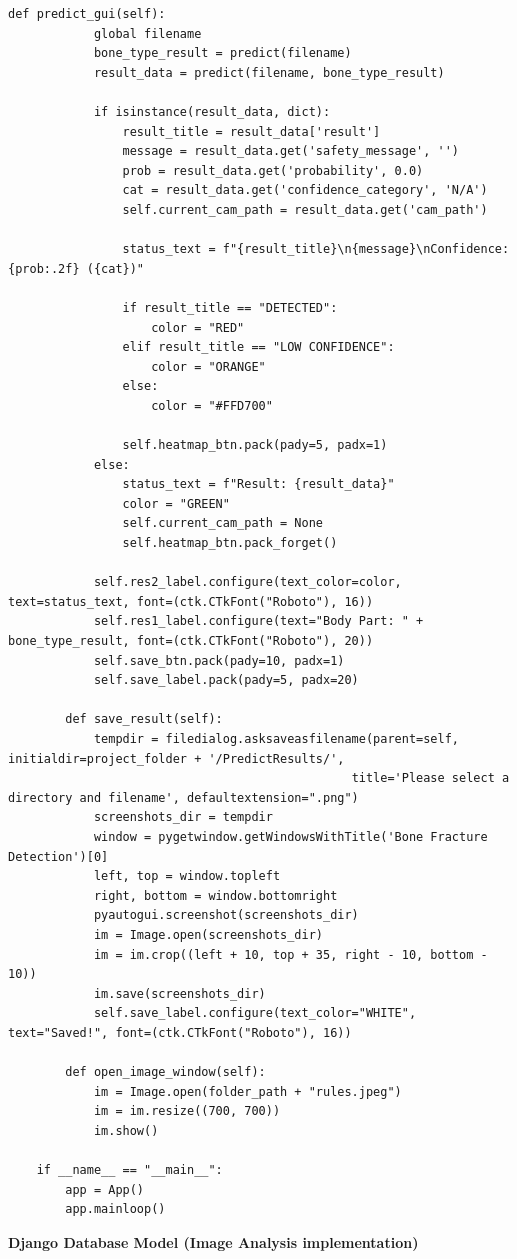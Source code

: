 \documentclass[a4paper,12pt]{report}
\begin{document}
\begin{lstlisting}[style=pythonstyle]
        def predict_gui(self):
            global filename
            bone_type_result = predict(filename)
            result_data = predict(filename, bone_type_result)
            
            if isinstance(result_data, dict):
                result_title = result_data['result']
                message = result_data.get('safety_message', '')
                prob = result_data.get('probability', 0.0)
                cat = result_data.get('confidence_category', 'N/A')
                self.current_cam_path = result_data.get('cam_path')
                
                status_text = f"{result_title}\n{message}\nConfidence: {prob:.2f} ({cat})"
                
                if result_title == "DETECTED":
                    color = "RED"
                elif result_title == "LOW CONFIDENCE":
                    color = "ORANGE"
                else:
                    color = "#FFD700" 
                    
                self.heatmap_btn.pack(pady=5, padx=1)
            else:
                status_text = f"Result: {result_data}"
                color = "GREEN"
                self.current_cam_path = None
                self.heatmap_btn.pack_forget()

            self.res2_label.configure(text_color=color, text=status_text, font=(ctk.CTkFont("Roboto"), 16))
            self.res1_label.configure(text="Body Part: " + bone_type_result, font=(ctk.CTkFont("Roboto"), 20))
            self.save_btn.pack(pady=10, padx=1)
            self.save_label.pack(pady=5, padx=20)

        def save_result(self):
            tempdir = filedialog.asksaveasfilename(parent=self, initialdir=project_folder + '/PredictResults/',
                                                title='Please select a directory and filename', defaultextension=".png")
            screenshots_dir = tempdir
            window = pygetwindow.getWindowsWithTitle('Bone Fracture Detection')[0]
            left, top = window.topleft
            right, bottom = window.bottomright
            pyautogui.screenshot(screenshots_dir)
            im = Image.open(screenshots_dir)
            im = im.crop((left + 10, top + 35, right - 10, bottom - 10))
            im.save(screenshots_dir)
            self.save_label.configure(text_color="WHITE", text="Saved!", font=(ctk.CTkFont("Roboto"), 16))

        def open_image_window(self):
            im = Image.open(folder_path + "rules.jpeg")
            im = im.resize((700, 700))
            im.show()

    if __name__ == "__main__":
        app = App()
        app.mainloop()
    \end{lstlisting}
    \vspace{2em}
    \textbf{Django Database Model (Image Analysis implementation)}\\[5pt]
\end{document}
